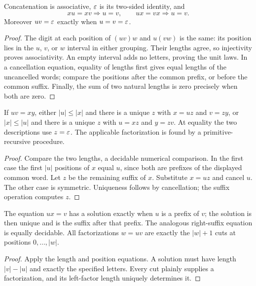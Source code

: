 \begin{theorem}\label{word:monoid}
Concatenation is associative, $\varepsilon$ is its two-sided identity, and
\[
 xu=xv\Rightarrow u=v,\qquad ux=vx\Rightarrow u=v.
\]
Moreover $uv=\varepsilon$ exactly when $u=v=\varepsilon$.
\end{theorem}
\begin{proof}
The digit at each position of $(uv)w$ and $u(vw)$ is the same: its position
lies in the $u$, $v$, or $w$ interval in either grouping. Their lengths
agree, so injectivity proves associativity. An empty interval adds no
letters, proving the unit laws. In a cancellation equation, equality of
lengths first gives equal lengths of the uncancelled words; compare the
positions after the common prefix, or before the common suffix. Finally,
the sum of two natural lengths is zero precisely when both are zero.
\end{proof}

\begin{lemma}\label{word:levi}
If $uv=xy$, either $|u|\le|x|$ and there is a unique $z$ with
$x=uz$ and $v=zy$, or $|x|\le|u|$ and there is a unique $z$ with
$u=xz$ and $y=zv$. At equality the two descriptions use $z=\varepsilon$.
The applicable factorization is found by a primitive-recursive procedure.
\end{lemma}
\begin{proof}
Compare the two lengths, a decidable numerical comparison. In the first
case the first $|u|$ positions of $x$ equal $u$, since both are prefixes
of the displayed common word. Let $z$ be the remaining suffix of $x$.
Substitute $x=uz$ and cancel $u$. The other case is symmetric.
Uniqueness follows by cancellation; the suffix operation computes $z$.
\end{proof}

\begin{corollary}\label{word:equations}
The equation $ux=v$ has a solution exactly when $u$ is a prefix of $v$;
the solution is then unique and is the suffix after that prefix. The
analogous right-suffix equation is equally decidable. All factorizations
$w=uv$ are exactly the $|w|+1$ cuts at positions $0,\ldots,|w|$.
\end{corollary}
\begin{proof}
Apply the length and position equations. A solution must have length
$|v|-|u|$ and exactly the specified letters. Every cut plainly supplies
a factorization, and its left-factor length uniquely determines it.
\end{proof}

